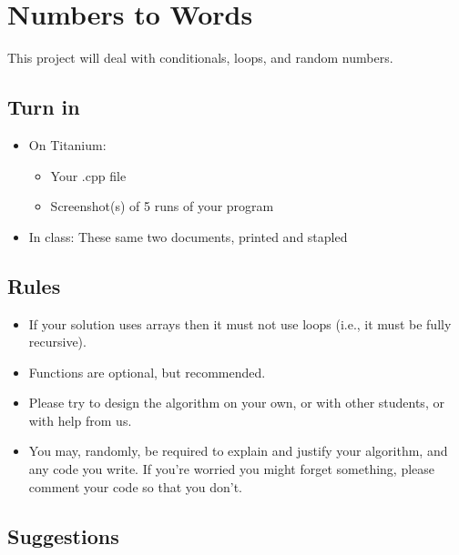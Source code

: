 \documentclass[12pt,letterpaper]{article}
\begin{document}
\thispagestyle{firstpage}


\section*{Numbers to Words}

This project will deal with conditionals, loops, and random numbers.


\filbreak
\subsection*{Turn in}

\begin{itemize}
  \item On Titanium:
    \begin{itemize}
      \item Your .cpp file
      \item Screenshot(s) of 5 runs of your program
    \end{itemize}
  \item In class: These same two documents, printed and stapled
\end{itemize}


\filbreak
\subsection*{Rules}

\begin{itemize}
  \item If your solution uses arrays then it must not use loops (i.e., it must
    be fully recursive).
  \item Functions are optional, but recommended.
  \item Please try to design the algorithm on your own, or with other students,
    or with help from us.
  \item You may, randomly, be required to explain and justify your algorithm,
    and any code you write.  If you're worried you might forget something,
    please comment your code so that you don't.
\end{itemize}


\filbreak
\subsection*{Suggestions}
\end{document}
